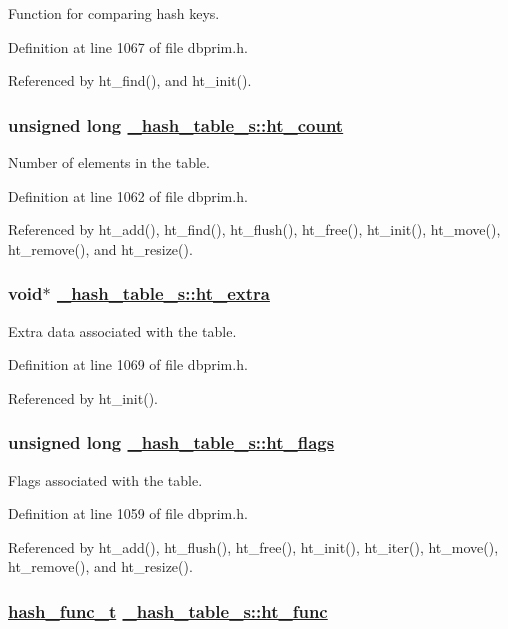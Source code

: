 Function for comparing hash keys. 

Definition at line 1067 of file dbprim.h.

Referenced by ht\_\-find(), and ht\_\-init().\hypertarget{struct__hash__table__s_o3}{
\subsubsection[ht\_\-count]{\setlength{\rightskip}{0pt plus 5cm}unsigned long \hyperlink{struct__hash__table__s_o3}{\_\-hash\_\-table\_\-s::ht\_\-count}}}
\label{struct__hash__table__s_o3}


Number of elements in the table. 

Definition at line 1062 of file dbprim.h.

Referenced by ht\_\-add(), ht\_\-find(), ht\_\-flush(), ht\_\-free(), ht\_\-init(), ht\_\-move(), ht\_\-remove(), and ht\_\-resize().\hypertarget{struct__hash__table__s_o10}{
\subsubsection[ht\_\-extra]{\setlength{\rightskip}{0pt plus 5cm}void$\ast$ \hyperlink{struct__hash__table__s_o10}{\_\-hash\_\-table\_\-s::ht\_\-extra}}}
\label{struct__hash__table__s_o10}


Extra data associated with the table. 

Definition at line 1069 of file dbprim.h.

Referenced by ht\_\-init().\hypertarget{struct__hash__table__s_o1}{
\subsubsection[ht\_\-flags]{\setlength{\rightskip}{0pt plus 5cm}unsigned long \hyperlink{struct__hash__table__s_o1}{\_\-hash\_\-table\_\-s::ht\_\-flags}}}
\label{struct__hash__table__s_o1}


Flags associated with the table. 

Definition at line 1059 of file dbprim.h.

Referenced by ht\_\-add(), ht\_\-flush(), ht\_\-free(), ht\_\-init(), ht\_\-iter(), ht\_\-move(), ht\_\-remove(), and ht\_\-resize().\hypertarget{struct__hash__table__s_o7}{
\subsubsection[ht\_\-func]{\setlength{\rightskip}{0pt plus 5cm}\hyperlink{group__dbprim__hash_ga4}{hash\_\-func\_\-t} \hyperlink{struct__hash__table__s_o7}{\_\-hash\_\-table\_\-s::ht\_\-func}}}
\label{struct__hash__table__s_o7}


